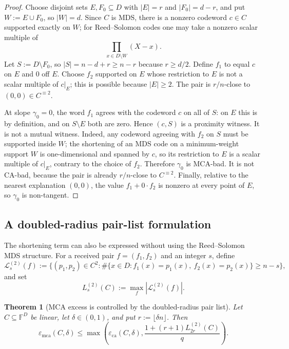 \documentclass[11pt]{amsart}
\newtheorem{theorem}{Theorem}[section]
\theoremstyle{definition}
\theoremstyle{remark}
\newcommand{\F}{\mathbb{F}}
\newcommand{\eca}{\varepsilon_{\mathrm{ca}}}
\newcommand{\emca}{\varepsilon_{\mathrm{mca}}}
\begin{document}
\begin{proof}
Choose disjoint sets $E,F_0\subseteq D$ with $|E|=r$ and $|F_0|=d-r$, and put
$W:=E\cup F_0$, so $|W|=d$.  Since $C$ is MDS, there is a nonzero codeword
$c\in C$ supported exactly on $W$; for Reed--Solomon codes one may take a nonzero
scalar multiple of
\[
        \prod_{x\in D\setminus W}(X-x).
\]
Let $S:=D\setminus F_0$, so $|S|=n-d+r\ge n-r$ because $r\ge d/2$.
Define $f_1$ to equal $c$ on $E$ and $0$ off $E$.  Choose $f_2$ supported on $E$
whose restriction to $E$ is not a scalar multiple of $c|_E$; this is possible
because $|E|\ge2$.  The pair is $r/n$-close to $(0,0)\in C^{\equiv2}$.

At slope $\gamma_0=0$, the word $f_1$ agrees with the codeword $c$ on all of
$S$: on $E$ this is by definition, and on $S\setminus E$ both are zero.  Hence
$(c,S)$ is a proximity witness.  It is not a mutual witness.  Indeed, any codeword
agreeing with $f_2$ on $S$ must be supported inside $W$; the shortening of an MDS
code on a minimum-weight support $W$ is one-dimensional and spanned by $c$, so
its restriction to $E$ is a scalar multiple of $c|_E$, contrary to the choice of
$f_2$.  Therefore $\gamma_0$ is MCA-bad.  It is not CA-bad, because the pair is
already $r/n$-close to $C^{\equiv2}$.  Finally, relative to the nearest
explanation $(0,0)$, the value $f_1+0\cdot f_2$ is nonzero at every point of $E$,
so $\gamma_0$ is non-tangent.
\end{proof}

\subsection{A doubled-radius pair-list formulation}

The shortening term can also be expressed without using the Reed--Solomon MDS
structure.  For a received pair $f=(f_1,f_2)$ and an integer $s$, define
\[
\mathcal L_s^{(2)}(f):=\{(p_1,p_2)\in C^2:
\#\{x\in D:f_1(x)=p_1(x),\ f_2(x)=p_2(x)\}\ge n-s\},
\]
and set
\[
        L_s^{(2)}(C):=\max_f|\mathcal L_s^{(2)}(f)|.
\]

\begin{theorem}[MCA excess is controlled by the doubled-radius pair list]
\label{thm:mca-excess-pair-list}
Let $C\subseteq\F^D$ be linear, let $\delta\in(0,1)$, and put
$r:=\lfloor\delta n\rfloor$.  Then
\[
        \emca(C,\delta)
        \le
        \max\left(\eca(C,\delta),
        \frac{1+(r+1)L_{2r}^{(2)}(C)}q\right).
\]
\end{theorem}
\end{document}
